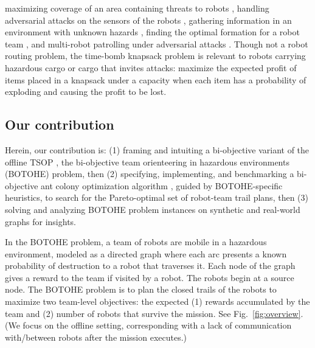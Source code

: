 \documentclass[fleqn,10pt,lineno]{wlpeerj}
\begin{document}
maximizing coverage of an area containing threats to robots \cite{korngut2023multi,yehoshua2016robotic}, 
handling adversarial attacks on the sensors of the robots \cite{liu2021distributed,zhou2022distributed,mayya2022adaptive,zhou2018resilient}, 
gathering information in an environment with unknown hazards \cite{schwager2017multi},
finding the optimal formation for a robot team \cite{shapira2015path},
and 
multi-robot patrolling under adversarial attacks \cite{huang2019survey}.
Though not a robot routing problem, the time-bomb knapsack problem \cite{monaci2022exact} is relevant to robots carrying hazardous cargo or cargo that invites attacks: maximize the expected profit of items placed in a knapsack under a capacity when each item has a probability of exploding and causing the profit to be lost.

\subsection{Our contribution}
Herein, our contribution is:
(1) framing and intuiting a bi-objective variant of the offline TSOP \cite{jorgensen2018team,jorgensen2017matroid,jorgensen2024matroid}, the bi-objective team orienteering in hazardous environments (BOTOHE) problem, then 
(2) specifying, implementing, and benchmarking a bi-objective ant colony optimization algorithm \cite{iredi2001bi}, guided by BOTOHE-specific heuristics, to search for the Pareto-optimal set of robot-team trail plans, then
(3) solving and analyzing BOTOHE problem instances on synthetic and real-world graphs for insights.

In the BOTOHE problem, 
a team of robots are mobile in a hazardous environment, modeled as a directed graph where each arc presents a known probability of destruction to a robot that traverses it.
Each node of the graph gives a reward to the team if visited by a robot.
The robots begin at a source node.
The BOTOHE problem is to plan the closed trails of the robots to maximize two team-level objectives: the expected
(1) rewards accumulated by the team and
(2) number of robots that survive the mission. 
See Fig.~\ref{fig:overview}.
(We focus on the offline setting, corresponding with a lack of communication with/between robots after the mission executes.)
\end{document}
